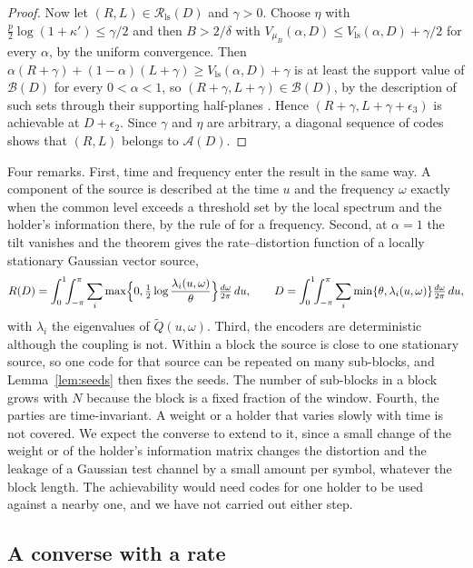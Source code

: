 \documentclass[11pt,onecolumn]{IEEEtran}
\newcommand{\dw}{\tfrac{d\omega}{2\pi}}
\newcommand{\Vls}{V_{\mathrm{ls}}}
\begin{document}
\begin{proof}
Now let $(R,L)\in\mathcal R_{\mathrm{ls}}(D)$ and $\gamma>0$. Choose
$\eta$ with $\tfrac p2\log(1+\kappa')\le\gamma/2$ and then
$B>2/\delta$ with $V_{\mu_B}(\alpha,D)\le\Vls(\alpha,D)+\gamma/2$ for
every $\alpha$, by the uniform convergence. Then
$\alpha(R+\gamma)+(1-\alpha)(L+\gamma)\ge\Vls(\alpha,D)+\gamma$ is at
least the support value of $\mathcal B(D)$ for every
$0<\alpha<1$, so $(R+\gamma,L+\gamma)\in\mathcal B(D)$, by the
description of such sets through their supporting half-planes
\cite[proof of Theorem~16]{part2}. Hence
$(R+\gamma,L+\gamma+\epsilon_3)$ is achievable at $D+\epsilon_2$. Since
$\gamma$ and $\eta$ are arbitrary, a diagonal sequence of codes shows
that $(R,L)$ belongs to $\mathcal A(D)$.
\end{proof}

Four remarks. First, time and frequency enter the result in the same
way. A component of the source is described at the time $u$ and the
frequency $\omega$ exactly when the common level exceeds a threshold
set by the local spectrum and the holder's information there, by the
rule of \cite{part2} for a frequency. Second, at $\alpha=1$ the tilt vanishes
and the theorem gives the rate--distortion function of a locally
stationary Gaussian vector source,
\[
R(D)=\int_0^1\!\!\int_{-\pi}^{\pi}\sum_i\max\Bigl\{0,\tfrac12\log\frac{\lambda_i(u,\omega)}{\theta}\Bigr\}\dw\,du,\qquad
D=\int_0^1\!\!\int_{-\pi}^{\pi}\sum_i\min\{\theta,\lambda_i(u,\omega)\}\dw\,du,
\]
with $\lambda_i$ the eigenvalues of $\tilde Q(u,\omega)$. Third, the
encoders are deterministic although the coupling is not. Within a
block the source is close to one stationary source, so one code for
that source can be repeated on many sub-blocks, and
Lemma~\ref{lem:seeds} then fixes the seeds. The number of sub-blocks in
a block grows with $N$ because the block is a fixed fraction of the
window. Fourth, the
parties are time-invariant. A weight or a holder that varies slowly
with time is not covered. We expect the converse to extend to it,
since a small change of the weight or of the holder's information
matrix changes the distortion and the leakage of a Gaussian test
channel by a small amount per symbol, whatever the block length. The
achievability would need codes for one holder to be used against a
nearby one, and we have not carried out either step.

\subsection{A converse with a rate}
\end{document}
